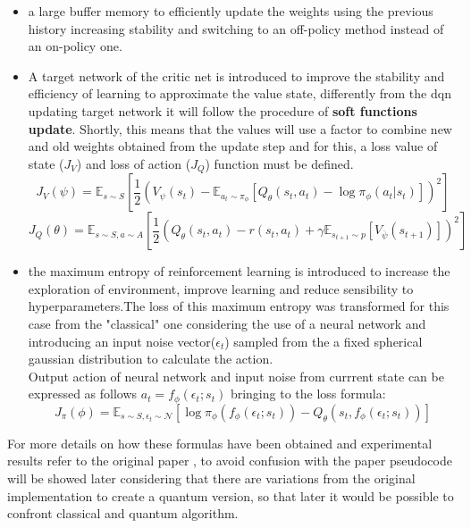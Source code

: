 \begin{itemize}
	\item a large buffer memory to efficiently update the weights using the previous history increasing stability and switching to an off-policy method instead of an on-policy one.
	\item A target network of the critic net is introduced to improve the stability and efficiency of learning to approximate the value state, differently from the \acrshort{dqn} updating target network it will follow the procedure of \textbf{soft functions update}. Shortly, this means that the values will use a factor to combine new and old weights obtained from the update step and for this, a loss value of state ($J_{V}$) and loss of action ($J_{Q}$) function must be defined.
	\begin{equation}\label{state of calue loss}
		J_{V}(\psi)= \mathbb{E}_{s \sim S}\left[ \frac{1}{2} (V_\psi(s_t) - \mathbb{E}_{a_t \sim \pi_\phi}[Q_\theta(s_t,a_t) - \log \pi_{\phi}(a_t|s_t)])^2 \right]
	\end{equation}
	\begin{equation}\label{state of action loss}
		J_{Q}(\theta)= \mathbb{E}_{s \sim S, a \sim A }\left[\frac{1}{2}(Q_\theta(s_t,a_t) - r(s_t,a_t) + \gamma \mathbb{E}_{s_{t+1} \sim p}[V_{\overline{\psi}}(s_{t+1})] )^2 \right]
	\end{equation}
	\item the maximum entropy of reinforcement learning is introduced to increase the exploration of environment, improve learning and reduce sensibility to hyperparameters.The loss of this maximum entropy was transformed for this case from the "classical" one considering the use of a neural network and introducing an input noise vector($\epsilon_t$) sampled from the a fixed spherical gaussian distribution to calculate the action.\\
	Output action of neural network and input noise from currrent state can be expressed as follows $a_t = f_\phi(\epsilon_t;s_t)$ bringing to the loss formula:
	\begin{equation}\label{policy loss}
		J_{\pi}(\phi)= \mathbb{E}_{s \sim S, \epsilon_t \sim \mathcal{N}}\left[ \log \pi_{\phi}(f_\phi(\epsilon_t;s_t)) - Q_{\theta}(s_t, f_\phi(\epsilon_t;s_t))\right]
	\end{equation}
\end{itemize}
For more details on how these formulas have been obtained and experimental results refer to the original paper \cite{DBLP:journals/corr/abs-1801-01290}, to avoid confusion with the paper pseudocode will be showed later considering that there are variations from the original implementation to create a quantum version, so that later it would be possible to confront classical and quantum algorithm.

